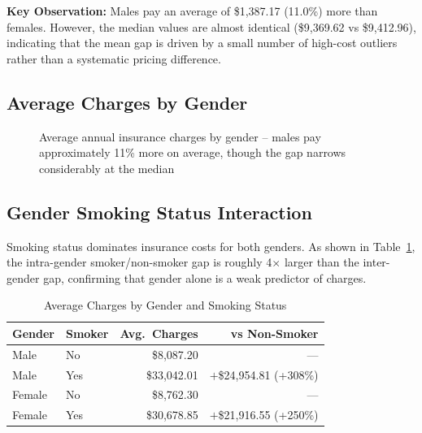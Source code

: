 \documentclass[12pt,a4paper]{report}
\begin{document}
\begin{infobox}
\textbf{Key Observation:} Males pay an average of \$1,387.17 (11.0\%) more than females. However, the median values are almost identical (\$9,369.62 vs \$9,412.96), indicating that the mean gap is driven by a small number of high-cost outliers rather than a systematic pricing difference.
\end{infobox}

\subsection{Average Charges by Gender}

\begin{figure}[H]
\centering
{}
\caption{Average annual insurance charges by gender -- males pay approximately 11\% more on average, though the gap narrows considerably at the median}
\end{figure}

\subsection{Gender \texttimes{} Smoking Status Interaction}

Smoking status dominates insurance costs for both genders. As shown in Table~\ref{tab:gender_smoker}, the intra-gender smoker/non-smoker gap is roughly 4$\times$ larger than the inter-gender gap, confirming that gender alone is a weak predictor of charges.

\begin{table}[H]
\centering
\caption{Average Charges by Gender and Smoking Status}
\label{tab:gender_smoker}
\begin{tabular}{llrr}
\toprule
\textbf{Gender} & \textbf{Smoker} & \textbf{Avg.\ Charges} & \textbf{vs Non-Smoker} \\
\midrule
Male   & No  & \$8,087.20  & ---                     \\
Male   & Yes & \$33,042.01 & $+$\$24,954.81 (+308\%) \\
Female & No  & \$8,762.30  & ---                     \\
Female & Yes & \$30,678.85 & $+$\$21,916.55 (+250\%) \\
\bottomrule
\end{tabular}
\end{table}
\end{document}
